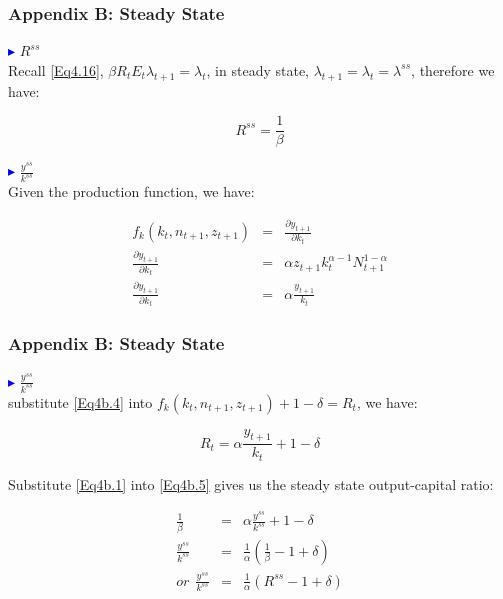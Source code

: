 \begin{frame}
\frametitle{Appendix B: Steady State} \vskip 0.1in
\textcolor{blue}{$\blacktriangleright$} $R^{ss}$\\

Recall \eqref{Eq4.16}, $\beta R_{t}E_{t}\lambda_{t+1} =
\lambda_{t}$, in steady state, $\lambda_{t+1} =
\lambda_{t}=\lambda^{ss}$, therefore we have:

\begin{equation}\label{Eq4b.1}
R^{ss}=\frac{1}{\beta}
\end{equation}

\textcolor{blue}{$\blacktriangleright$} $\frac{y^{ss}}{k^{ss}}$\\

Given the production function, we have:

\begin{eqnarray}
f_{k}(k_{t},n_{t+1},z_{t+1}) &=& \frac{\partial y_{t+1}}{\partial
k_{t}}\label{Eq4b.2}\\
\frac{\partial y_{t+1}}{\partial
k_{t}} &=& \alpha z_{t+1}k_{t}^{\alpha-1}N_{t+1}^{1-\alpha}\label{Eq4b.3}\\
\frac{\partial y_{t+1}}{\partial k_{t}} &=& \alpha
\frac{y_{t+1}}{k_{t}}\label{Eq4b.4}
\end{eqnarray}
\end{frame}

\begin{frame}
\frametitle{Appendix B: Steady State} \vskip 0.1in

\textcolor{blue}{$\blacktriangleright$} $\frac{y^{ss}}{k^{ss}}$\\
substitute \eqref{Eq4b.4} into
$f_{k}(k_{t},n_{t+1},z_{t+1})+1-\delta =R_{t}$, we have:

\begin{equation}\label{Eq4b.5}
R_{t}=\alpha \frac{y_{t+1}}{k_{t}}+1-\delta
\end{equation}

\pause

Substitute \eqref{Eq4b.1} into \eqref{Eq4b.5} gives us the steady
state output-capital ratio:

\begin{eqnarray}
\frac{1}{\beta} &=& \alpha \frac{y^{ss}}{k^{ss}} +1-\delta
\label{Eq4b.6}\\
\frac{y^{ss}}{k^{ss}} &=& \frac{1}{\alpha}(\frac{1}{\beta}
-1+\delta)\label{Eq4b.7}\\
or ~~ \frac{y^{ss}}{k^{ss}} &=& \frac{1}{\alpha}(R^{ss}
-1+\delta)\label{Eq4b.8}
\end{eqnarray}
\end{frame}




